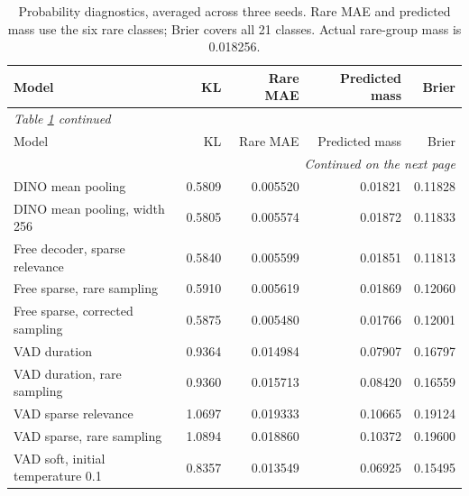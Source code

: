 \begingroup
\small
\setlength{\tabcolsep}{4pt}
\begin{longtable}{p{6.5cm}rrrr}
\caption{Probability diagnostics, averaged across three seeds. Rare MAE and predicted mass use the six rare classes; Brier covers all 21 classes. Actual rare-group mass is 0.018256.}\label{tab:rare}\\
\toprule
Model & KL & Rare MAE & Predicted mass & Brier \\
\midrule\endfirsthead
\multicolumn{5}{l}{\textit{Table \ref{tab:rare} continued}}\\
\toprule
Model & KL & Rare MAE & Predicted mass & Brier \\
\midrule\endhead
\midrule\multicolumn{5}{r}{\textit{Continued on the next page}}\\\endfoot
\bottomrule\endlastfoot
DINO mean pooling & 0.5809 & 0.005520 & 0.01821 & 0.11828 \\
DINO mean pooling, width 256 & 0.5805 & 0.005574 & 0.01872 & 0.11833 \\
Free decoder, sparse relevance & 0.5840 & 0.005599 & 0.01851 & 0.11813 \\
Free sparse, rare sampling & 0.5910 & 0.005619 & 0.01869 & 0.12060 \\
Free sparse, corrected sampling & 0.5875 & 0.005480 & 0.01766 & 0.12001 \\
VAD duration & 0.9364 & 0.014984 & 0.07907 & 0.16797 \\
VAD duration, rare sampling & 0.9360 & 0.015713 & 0.08420 & 0.16559 \\
VAD sparse relevance & 1.0697 & 0.019333 & 0.10665 & 0.19124 \\
VAD sparse, rare sampling & 1.0894 & 0.018860 & 0.10372 & 0.19600 \\
VAD soft, initial temperature 0.1 & 0.8357 & 0.013549 & 0.06925 & 0.15495 \\
\end{longtable}
\endgroup
